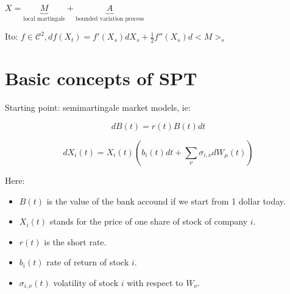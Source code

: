 \documentclass{article} \usepackage[utf8]{inputenc}
\begin{document}
$X = \underbrace{M}_{\text{local martingale}} + \underbrace{A}_{\text{bounded variation process}}$

Ito: $f \in \mathcal C^2, df(X_t) = f'(X_s)dX_s + \frac12 f''(X_s)d<M>_s$
\section{Basic concepts of SPT}
Starting point: semimartingale market models, ie:

\begin{equation}
  dB(t) = r(t) B(t) dt
\end{equation}

\begin{equation}
dX_i(t) = X_i(t) \left(b_i(t)dt + \sum_{\nu} \sigma_{i,\nu} dW_{\mu}(t)\right)
\end{equation}



Here:
\begin{itemize}
\item $B(t)$ is the value of the bank accound if we start from 1 dollar today.
\item $X_i(t)$ stands for the price of one share of stock of company $i$.
\item $r(t)$ is the short rate.
\item $b_i(t)$ rate of return of stock $i$.
\item $\sigma_{i, \nu}(t)$ volatility of stock $i$ with respect to $W_{\nu}$.
\end{itemize}
\end{document}

